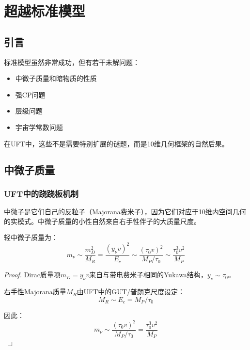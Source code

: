 \section{超越标准模型}
\label{sec:beyond_sm}

\subsection{引言}

标准模型虽然非常成功，但有若干未解问题：
\begin{itemize}
    \item 中微子质量和暗物质的性质
    \item 强CP问题
    \item 层级问题
    \item 宇宙学常数问题
\end{itemize}

在UFT中，这些不是需要特别扩展的谜题，而是10维几何框架的自然后果。

\subsection{中微子质量}

\subsubsection{UFT中的跷跷板机制}

\begin{insight}[来自Majorana模式的中微子质量]
中微子是它们自己的反粒子（Majorana费米子），因为它们对应于10维内空间几何的实模式。中微子质量的小性自然来自右手性伴子的大质量尺度。
\end{insight}

\begin{theorem}[跷跷板质量公式]
轻中微子质量为：
\begin{equation}
    m_\nu \sim \frac{m_D^2}{M_R} = \frac{(y_\nu v)^2}{E_c} \sim \frac{(\tau_0 v)^2}{M_P/\tau_0} \sim \frac{\tau_0^3 v^2}{M_P}
\end{equation}
\end{theorem}

\begin{proof}
Dirac质量项$m_D = y_\nu v$来自与带电费米子相同的Yukawa结构，$y_\nu \sim \tau_0$。

右手性Majorana质量$M_R$由UFT中的GUT/普朗克尺度设定：
\begin{equation}
    M_R \sim E_c = M_P/\tau_0
\end{equation}

因此：
\begin{equation}
    m_\nu \sim \frac{(\tau_0 v)^2}{M_P/\tau_0} = \frac{\tau_0^3 v^2}{M_P}
\end{equation}
\end{proof}

